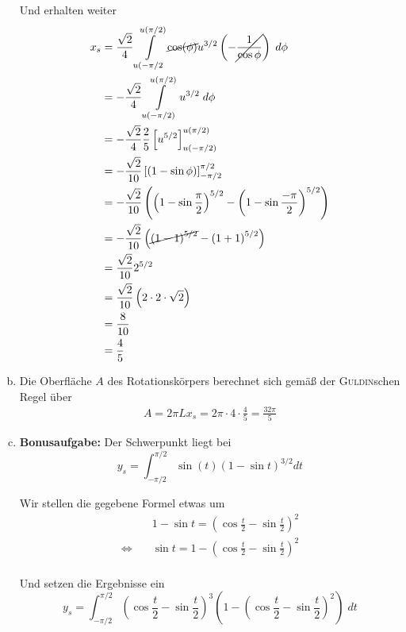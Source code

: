 \documentclass[a4paper,german,12pt,smallheadings]{scrartcl}
\begin{document}
\begin{enumerate}[a)]
    Und erhalten weiter
    \begin{align*}
      x_s &= \frac{\sqrt{2}}{4} \int\limits_{u(-\pi/2}^{u(\pi/2)} \cancel{\cos(\phi)} u^{3/2} \left(-\cancel{\frac{1}{\cos \phi}}\right) \; d\phi \\
          &= -\frac{\sqrt{2}}{4} \int\limits_{u(-\pi/2)}^{u(\pi/2)} u^{3/2} \; d\phi \\
          &= -\frac{\sqrt{2}}{4} \frac{2}{5} \left[u^{5/2}\right]_{u(-\pi/2)}^{u(\pi/2)} \\
          &= -\frac{\sqrt{2}}{10}\left[(1-\sin \phi)\right]_{-\pi/2}^{\pi/2} \\
          &= -\frac{\sqrt{2}}{10} \left(\left(1-\sin \frac{\pi}{2}\right)^{5/2} - \left(1-\sin \frac{-\pi}{2}\right)^{5/2}\right) \\
          &= -\frac{\sqrt{2}}{10} \left(\cancel{\left(1-1\right)^{5/2}} - \left(1+1\right)^{5/2}\right) \\
          &= \frac{\sqrt{2}}{10} 2^{5/2} \\
          &= \frac{\sqrt{2}}{10} \left(2\cdot2\cdot\sqrt{2}\right) \\
          &= \frac{8}{10} \\
          &= \frac{4}{5} \\
    \end{align*}
  \item
    Die Oberfläche $A$ des Rotationskörpers berechnet sich gemäß der
    \textsc{Guldin}schen Regel über
    \begin{align*}
      A = 2 \pi L x_s = 2 \pi \cdot 4 \cdot \frac{4}{5} = \frac{32 \pi}{5}
    \end{align*}
  \item
    \textbf{Bonusaufgabe:}
    Der Schwerpunkt liegt bei
    \begin{equation*}
      y_s = \int_{-\pi/2}^{\pi/2} \sin(t)(1-\sin t)^{3/2} dt
    \end{equation*}

    Wir stellen die gegebene Formel etwas um
    \begin{align*}
      &1-\sin t = \left(\cos \frac{t}{2} - \sin \frac{t}{2}\right)^2 \\
      \Leftrightarrow\quad&\sin t = 1- \left(\cos \frac{t}{2} - \sin \frac{t}{2}\right)^2 \\
    \end{align*}

    Und setzen die Ergebnisse ein
    \begin{equation*}
      y_s = \int_{-\pi/2}^{\pi/2} \left(\cos \frac{t}{2} - \sin \frac{t}{2}\right)^3 \left(1-\left(\cos \frac{t}{2} - \sin \frac{t}{2}\right)^2\right) \; dt
    \end{equation*}


\end{enumerate}
\end{document}
